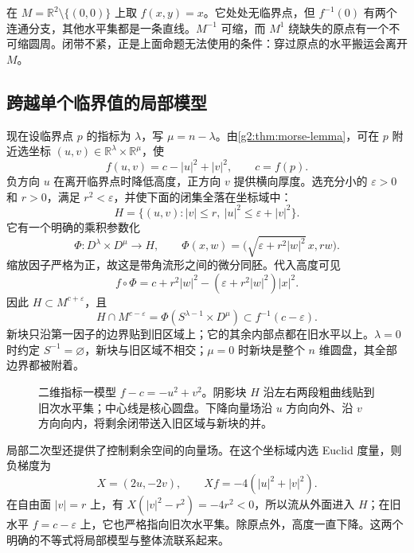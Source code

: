 \begin{example}
	在 \(M=\mathbb R^2\setminus\{(0,0)\}\) 上取 \(f(x,y)=x\)。它处处无临界点，但 \(f^{-1}(0)\) 有两个连通分支，其他水平集都是一条直线。\(M^{-1}\) 可缩，而 \(M^1\) 绕缺失的原点有一个不可缩圆周。闭带不紧，正是上面命题无法使用的条件：穿过原点的水平搬运会离开 \(M\)。
\end{example}

\subsection{跨越单个临界值的局部模型}
\label{g2:subsec:1702:02}
现在设临界点 \(p\) 的指标为 \(\lambda\)，写 \(\mu=n-\lambda\)。由\cref{g2:thm:morse-lemma}，可在 \(p\) 附近选坐标 \((u,v)\in\mathbb R^\lambda\times\mathbb R^\mu\)，使
\begin{equation}\label{g2:eq:morse-local-handle-model}
	f(u,v)=c-|u|^2+|v|^2,\qquad c=f(p).
\end{equation}
负方向 \(u\) 在离开临界点时降低高度，正方向 \(v\) 提供横向厚度。选充分小的 \(\varepsilon>0\) 和 \(r>0\)，满足 \(r^2<\varepsilon\)，并使下面的闭集全落在坐标域中：
\[
	H=\bigl\{(u,v):|v|\le r,\ |u|^2\le\varepsilon+|v|^2\bigr\}.
\]
它有一个明确的乘积参数化
\begin{equation}\label{g2:eq:morse-handle-parametrization}
	\Phi:D^\lambda\times D^\mu\longrightarrow H,
	\qquad
	\Phi(x,w)=\bigl(\sqrt{\varepsilon+r^2|w|^2}\,x,rw\bigr).
\end{equation}
缩放因子严格为正，故这是带角流形之间的微分同胚。代入高度可见
\[
	f\circ\Phi
	=c+r^2|w|^2-(\varepsilon+r^2|w|^2)|x|^2.
\]
因此 \(H\subset M^{c+\varepsilon}\)，且
\begin{equation}\label{g2:eq:morse-handle-attaching-face}
	H\cap M^{c-\varepsilon}
	=\Phi(S^{\lambda-1}\times D^\mu)
	\subset f^{-1}(c-\varepsilon).
\end{equation}
新块只沿第一因子的边界贴到旧区域上；它的其余内部点都在旧水平以上。\(\lambda=0\) 时约定 \(S^{-1}=\varnothing\)，新块与旧区域不相交；\(\mu=0\) 时新块是整个 \(n\) 维圆盘，其全部边界都被附着。

\begin{figure}[htbp]
	\centering
	
	\caption[临界点附近的把手]{二维指标一模型 \(f-c=-u^2+v^2\)。阴影块 \(H\) 沿左右两段粗曲线贴到旧次水平集；中心线是核心圆盘。下降向量场沿 \(u\) 方向向外、沿 \(v\) 方向向内，将剩余闭带送入旧区域与新块的并。}
	\label{g2:fig:morse-local-handle}
\end{figure}

局部二次型还提供了控制剩余空间的向量场。在这个坐标域内选 Euclid 度量，则负梯度为
\[
	X=(2u,-2v),\qquad Xf=-4(|u|^2+|v|^2).
\]
在自由面 \(|v|=r\) 上，有 \(X(|v|^2-r^2)=-4r^2<0\)，所以流从外面进入 \(H\)；在旧水平 \(f=c-\varepsilon\) 上，它也严格指向旧次水平集。除原点外，高度一直下降。这两个明确的不等式将局部模型与整体流联系起来。

